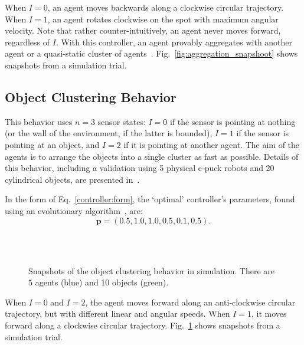 When $I=0$, an agent moves backwards along a clockwise circular trajectory. When $I=1$, an agent rotates clockwise on the spot with maximum angular velocity. Note that rather counter-intuitively, an agent never moves forward, regardless of $I$. With this controller, an agent provably aggregates with another agent or a quasi-static cluster of agents~\cite{Gauci2014_ijrr}. Fig.~\ref{fig:aggregation_snapshoot} shows snapshots from a simulation trial.

\subsection{Object Clustering Behavior}
This behavior uses $n=3$ sensor states: $I=0$ if the sensor is pointing at nothing (or the wall of the environment, if the latter is bounded), $I=1$ if the sensor is pointing at an object, and $I=2$ if it is pointing at another agent. The aim of the agents is to arrange the objects into a single cluster as fast as possible. Details of this behavior, including a validation using 5 physical e-puck robots and 20 cylindrical objects, are presented in~\cite{Melvin2014_aamas}.

In the form of Eq.~\eqref{controller:form}, the `optimal' controller's parameters, found using an evolutionary algorithm~\cite{Melvin2014_aamas}, are:
\begin{equation}\label{eq:clustering_optimal_controller}
\mathbf{p} = \left( 0.5, 1.0, 1.0, 0.5, 0.1, 0.5 \right).
\end{equation} 

\captionsetup[subfigure]{labelformat=empty}  
\begin{figure}[!t]
	\centering
	\\
	\\
	\caption{Snapshots of the object clustering behavior in simulation. There are $5$ agents (blue) and 10 objects (green).}
	\label{fig:clustering_snapshoot}
\end{figure}

When $I=0$ and $I=2$, the agent moves forward along an anti-clockwise circular trajectory, but with different linear and angular speeds. When $I=1$, it moves forward along a clockwise circular trajectory. Fig.~\ref{fig:clustering_snapshoot} shows snapshots from a simulation trial.

